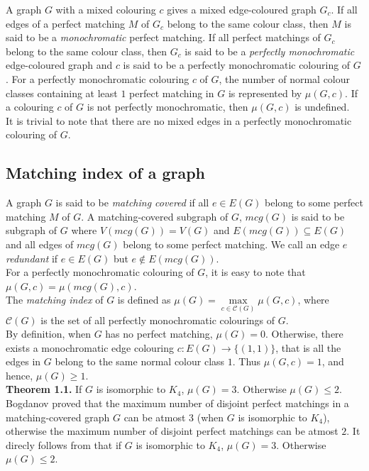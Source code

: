 \documentclass[11pt]{article}
\begin{document}
A graph $G$ with a mixed colouring $c$ gives a mixed edge-coloured graph $G_c$. If all edges of a perfect matching $M$ of $G_c$ belong to the same colour class, then $M$ is said to be a \textit{monochromatic} perfect matching. If all perfect matchings of $G_c$ belong to the same colour class, then $G_c$ is said to be a \textit{perfectly monochromatic} edge-coloured graph and $c$ is said to be a perfectly monochromatic colouring of $G$. For a perfectly monochromatic colouring $c$ of $G$, the number of normal colour classes containing at least $1$ perfect matching in $G$ is represented by $\mu(G,c)$. If a colouring $c$ of $G$ is not perfectly monochromatic, then $\mu(G,c)$ is undefined.\\
It is trivial to note that there are no mixed edges in a perfectly monochromatic colouring of $G$.

\subsection*{Matching index of a graph}
A graph $G$ is said to be \textit{matching covered} if all $e \in E(G)$ belong to some perfect matching $M$ of $G$. A matching-covered subgraph of $G$, $mcg(G)$ is said to be subgraph of $G$ where $V(mcg(G))=V(G)$ and $E(mcg(G)) \subseteq E(G)$ and all edges of $mcg(G)$ belong to some perfect matching. We call an edge $e$ \textit{redundant} if $e \in E(G)$ but $e \notin E(mcg(G))$.\\
For a perfectly monochromatic colouring of $G$, it is easy to note that $\mu(G,c)=\mu(mcg(G),c)$.\medskip\\
The \textit{matching index} of $G$ is defined as $\mu(G) = \max\limits_{c \in \mathcal{C}(G)} \mu(G,c)$, where $\mathcal{C}(G)$ is the set of all perfectly monochromatic colourings of $G$.\\
By definition, when $G$ has no perfect matching, $\mu(G)=0$. Otherwise, there exists a monochromatic edge colouring $c:E(G)\to\{(1,1)\}$, that is all the edges in $G$ belong to the same normal colour class $1$. Thus $\mu(G,c)=1$, and hence, $\mu(G)\ge 1$.\\

\textbf{Theorem 1.1.} If $G$ is isomorphic to $K_4$, $\mu(G)=3$. Otherwise $\mu(G)\le 2$. \\
Bogdanov\cite{bogdanov} proved that the maximum number of disjoint perfect matchings in a matching-covered graph $G$ can be atmost $3$ (when $G$ is isomorphic to $K_4$), otherwise the maximum number of disjoint perfect matchings can be atmost $2$. It direcly follows from \cite{bogdanov} that if $G$ is isomorphic to $K_4$, $\mu(G)=3$. Otherwise $\mu(G) \le 2$.\\
\end{document}
